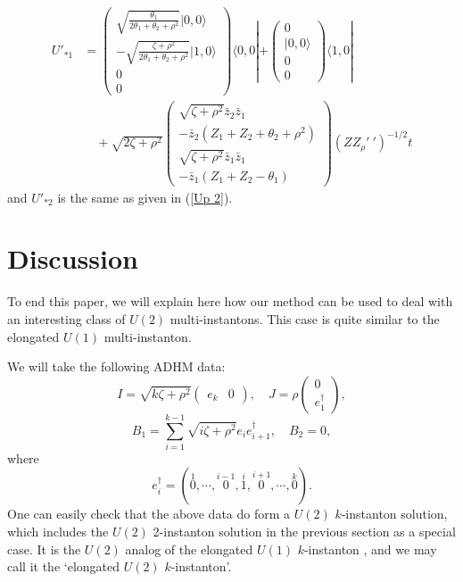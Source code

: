 \documentclass[a4paper,a4paper]{article}
\begin{document}
\begin{equation}\begin{array}{rl}
U'_{*1}&=\left(\begin{array}{c} \sqrt{\frac{\theta_1}{2\theta_1+
\theta_2+\rho^2}}|0,0\rangle \\
-\sqrt{\frac{\zeta+\rho^2}{2\theta_1+ \theta_2+\rho^2}}|1,0\rangle
\\ 0 \\ 0
\end{array}\right)\langle 0,0|+\left(\begin{array}{c} 0
\\ |0,0\rangle \\
0 \\ 0
\end{array}\right)\langle 1,0|\\
&\quad+\sqrt{2\zeta+\rho^2}\left(\begin{array}{c}
\sqrt{\zeta+\rho^2}\bar{z}_2\bar{z}_1 \\
-\bar{z}_2(Z_1+Z_2+\theta_2+\rho^2) \\
\sqrt{\zeta+\rho^2}\bar{z}_1\bar{z}_1 \\
-\bar{z}_1(Z_1+Z_2-\theta_1) \end{array}\right)(Z
Z_\rho'~')^{-1/2}t
\end{array}\end{equation}
and $U'_{*2}$ is the same as given in (\ref{Up 2}).

\section{Discussion}

To end this paper, we will explain here how our method can be used
to deal with an interesting class of $U(2)$ multi-instantons. This
case is quite similar to the elongated $U(1)$ multi-instanton.

We will take the following ADHM data:
\begin{equation}
I=\sqrt{k\zeta+\rho^2}\left(\begin{array}{cc} e_k & 0
\end{array}\right),\quad J=\rho\left(\begin{array}{c} 0
\\ e_1^\dag \end{array}\right),
\end{equation}
\begin{equation}
B_1=\sum_{i=1}^{k-1}\sqrt{i\zeta+\rho^2}e_i e_{i+1}^\dag,\quad
B_2=0,
\end{equation}
where
\begin{equation}
e_i^\dag=(\stackrel{1}{0},\cdots,\stackrel{i-1}{0},
\stackrel{i}{1},\stackrel{i+1}{0},\cdots,\stackrel{k}{0}).
\end{equation}
One can easily check that the above data do form a $U(2)$
$k$-instanton solution, which includes the $U(2)$ 2-instanton
solution in the previous section as a special case. It is the
$U(2)$ analog of the elongated $U(1)$ $k$-instanton
\cite{elongated}, and we may call it the `elongated $U(2)$
$k$-instanton'.
\end{document}
